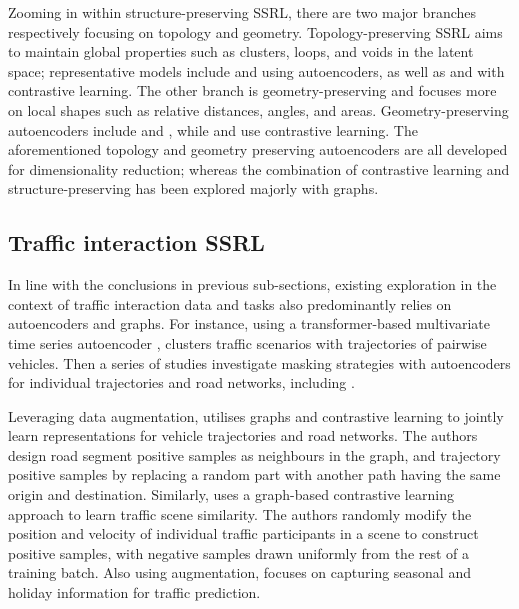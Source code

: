 Zooming in within structure-preserving SSRL, there are two major branches respectively focusing on topology and geometry. Topology-preserving SSRL aims to maintain global properties such as clusters, loops, and voids in the latent space; representative models include \cite{moor2020topoae} and \cite{trofimov2023rtdae} using autoencoders, as well as \cite{madhu2023toposrl} and \cite{Chen2024topogcl} with contrastive learning. The other branch is geometry-preserving and focuses more on local shapes such as relative distances, angles, and areas. Geometry-preserving autoencoders include \cite{Nazari2023geomae} and \cite{lim2024ggae}, while \cite{li2022geomgcl} and \cite{Koishekenov2023} use contrastive learning. The aforementioned topology and geometry preserving autoencoders are all developed for dimensionality reduction; whereas the combination of contrastive learning and structure-preserving has been explored majorly with graphs.

\subsection{Traffic interaction SSRL}
In line with the conclusions in previous sub-sections, existing exploration in the context of traffic interaction data and tasks also predominantly relies on autoencoders and graphs. For instance, using a transformer-based multivariate time series autoencoder \cite{zerveas2021transformer},  \cite{lu2022learning} clusters traffic scenarios with trajectories of pairwise vehicles. Then a series of studies investigate masking strategies with autoencoders for individual trajectories and road networks, including \cite{Cheng2023mae,Chen2023trajmae,lan2024sept}. 

Leveraging data augmentation, \cite{Mao2022jointlycontrastive} utilises graphs and contrastive learning to jointly learn representations for vehicle trajectories and road networks. The authors design road segment positive samples as neighbours in the graph, and trajectory positive samples by replacing a random part with another path having the same origin and destination. Similarly, \cite{Zipfl2023trafficsimilarity} uses a graph-based contrastive learning approach to learn traffic scene similarity. The authors randomly modify the position and velocity of individual traffic participants in a scene to construct positive samples, with negative samples drawn uniformly from the rest of a training batch. Also using augmentation, \cite{Zheng2024longterm} focuses on capturing seasonal and holiday information for traffic prediction.


